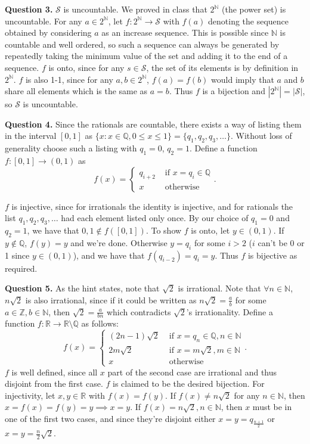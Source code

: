 \documentclass[letterpaper, reqno,11pt]{article}
\begin{document}
{\medskip\noindent\bf Question 3.} $\mathcal S$ is uncountable. We proved in class that $2^{\mathbb N}$ (the power set) is uncountable. For any $a\in 2^{\mathbb N}$, let $f:2^{\mathbb N}\to \mathcal S$ with $f(a)$ denoting the sequence obtained by considering $a$ as an increase sequence. This is possible since $\mathbb N$ is countable and well ordered, so such a sequence can always be generated by repeatedly taking the minimum value of the set and adding it to the end of a sequence. $f$ is onto, since for any $s\in\mathcal S$, the set of its elements is by definition in $2^{\mathbb N}$. $f$ is also 1-1, since for any $a, b\in 2^{\mathbb N}$, $f(a)=f(b)$ would imply that $a$ and $b$ share all elements which is the same as $a=b$. Thus $f$ is a bijection and $|2^{\mathbb N}|=|\mathcal S|$, so $\mathcal S$ is uncountable.

\newpage

{\medskip\noindent\bf Question 4.} Since the rationals are countable, there exists a way of listing them in the interval $[0,1]$ as $\{x:x\in\mathbb{Q}, 0\leq x\leq 1\}=\{q_1, q_2, q_3, \ldots\}$. Without loss of generality choose such a listing with $q_1=0$, $q_2=1$. Define a function $f:[0,1]\to(0,1)$ as
\[
f(x)=\begin{cases}
    q_{i+2}&\text{ if } x=q_i\in \mathbb{Q}\\
    x&\text{ otherwise}
\end{cases}
.\]

$f$ is injective, since for irrationals the identity is injective, and for rationals the list $q_1, q_2, q_3, \ldots$ had each element listed only once. By our choice of $q_1=0$ and $q_2=1$, we have that $0,1\notin f([0,1])$. To show $f$ is onto, let $y\in (0,1)$. If $y\notin \mathbb{Q}$, $f(y)=y$ and we're done. Otherwise $y=q_i$ for some $i>2$ ($i$ can't be 0 or 1 since $y\in (0,1)$), and we have that $f(q_{i-2})=q_i=y$. Thus $f$ is bijective as required.

\newpage

{\medskip\noindent\bf Question 5.} As the hint states, note that $\sqrt{2} $ is irrational. Note that $\forall n\in \mathbb{N}$, $n\sqrt{2} $ is also irrational, since if it could be written as $n\sqrt{2} =\frac{a}{b}$ for some $a\in \mathbb{Z}, b\in \mathbb{N}$, then $\sqrt{2} =\frac{a}{bn}$ which contradicts $\sqrt{2} $'s irrationality. Define a function $f:\mathbb{R}\to \mathbb{R}\setminus \mathbb{Q}$ as follows:
\[
f(x)=\begin{cases}
    (2n-1)\sqrt{2} &\text{ if }x=q_n\in \mathbb{Q}, n\in \mathbb{N}\\
    2m\sqrt{2} &\text{ if }x=m\sqrt{2}, m\in \mathbb{N}\\
    x&\text{ otherwise}
\end{cases}
.\]
$f$ is well defined, since all $x$ part of the second case are irrational and thus disjoint from the first case. $f$ is claimed to be the desired bijection. For injectivity, let $x,y\in \mathbb{R}$ with $f(x)=f(y)$. If $f(x)\neq n\sqrt{2} $ for any $n\in \mathbb{N}$, then $x=f(x)=f(y)=y\implies x=y$. If $f(x)=n\sqrt{2}, n\in \mathbb{N}$, then $x$ must be in one of the first two cases, and since they're disjoint either $x=y=q_{\frac{n+1}{2}}$ or $x=y=\frac{n}{2}\sqrt{2} $.
\end{document}
